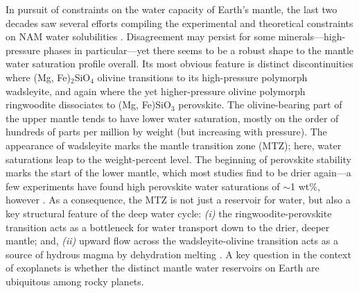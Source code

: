 \documentclass[fleqn,usenatbib]{mnras}
\begin{document}
In pursuit of constraints on the water capacity of Earth's mantle, the last two decades saw several efforts compiling the experimental and theoretical constraints on NAM water solubilities \citep[e.g.,][]{keppler_thermodynamics_2006, ohtani_hydrous_2015, demouchy_distribution_2016, tikoo_fate_2017, dong_constraining_2021, andrault_mantle_2022}. Disagreement may persist for some minerals---high-pressure phases in particular---yet there seems to be a robust shape to the mantle water saturation profile overall. Its most obvious feature is distinct discontinuities where (Mg, Fe)$_2$SiO$_4$ olivine transitions to its high-pressure polymorph wadsleyite, and again where the yet higher-pressure olivine polymorph ringwoodite dissociates to (Mg, Fe)SiO$_3$ perovskite. The olivine-bearing part of the upper mantle tends to have lower water saturation, mostly on the order of hundreds of parts per million by weight (but increasing with pressure). The appearance of wadsleyite marks the mantle transition zone (MTZ); here, water saturations leap to the weight-percent level. The beginning of perovskite stability marks the start of the lower mantle, which most studies find to be drier again---a few experiments have found high perovskite water saturations of $\sim$1 wt\%, however \citep{murakami_water_2002, fu_water_2019}. As a consequence, the MTZ is not just a reservoir for water, but also a key structural feature of the deep water cycle: \textit{(i)} the ringwoodite-perovskite transition acts as a bottleneck for water transport down to the drier, deeper mantle; and, \textit{(ii)} upward flow across the wadsleyite-olivine transition acts as a source of hydrous magma by dehydration melting \citep{bercovici_whole-mantle_2003, andrault_mantle_2022}. A key question in the context of exoplanets is whether the distinct mantle water reservoirs on Earth are ubiquitous among rocky planets.
\end{document}
